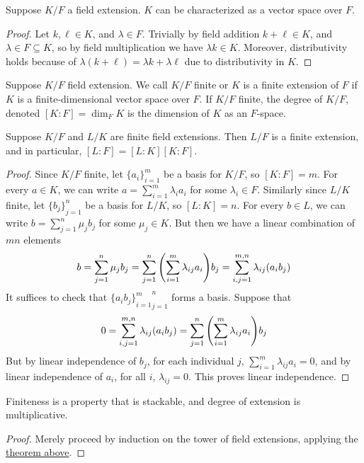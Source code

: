 \begin{proposition}\label{prop:field-extension-vsp}
    Suppose \(K/F\) a field extension.
    \(K\) can be characterized as a vector space over \(F\).
\end{proposition}
\begin{proof}
    Let \(k,\ell \in K\), and \(\lambda \in F\).
    Trivially by field addition \(k + \ell \in K\),
    and \(\lambda \in F \subseteq K\),
    so by field multiplication we have \(\lambda k \in K\).
    Moreover, distributivity holds because of
    \(\lambda(k+\ell) = \lambda k + \lambda \ell\)
    due to distributivity in \(K\).
\end{proof}

\begin{definition}
    Suppose \(K/F\) field extension.
    We call \(K/F\) finite or \(K\) is a finite extension of \(F\)
    if \(K\) is a finite-dimensional vector space over \(F\).
    If \(K/F\) finite, the degree of \(K/F\),
    denoted \([K:F] = \dim_F K\)
    is the dimension of \(K\) as an \(F\)-space.
\end{definition}
\begin{theorem}\label{thm:finite-extension-stack}
    Suppose \(K/F\) and \(L/K\) are finite field extensions.
    Then \(L/F\) is a finite extension,
    and in particular, \([L:F] = [L:K][K:F]\).
\end{theorem}
\begin{proof}
    Since \(K/F\) finite, let \({\{a_i\}}_{i=1}^m\) be a basis for \(K/F\),
    so \([K:F] = m\).
    For every \(a \in K\), we can write \(a = \sum_{i=1}^m \lambda_i a_i\)
    for some \(\lambda_i \in F\).
    Similarly since \(L/K\) finite,
    let \({\{b_j\}}_{j=1}^n\) be a basis for \(L/K\), so \([L:K] = n\).
    For every \(b \in L\), we can write \(b = \sum_{j=1}^n \mu_j b_j\)
    for some \(\mu_j \in K\).
    But then we have a linear combination of \(mn\) elements
    \begin{equation*}
        b = \sum_{j=1}^n \mu_j b_j
        = \sum_{j=1}^n \qty(\sum_{i=1}^m \lambda_{ij} a_i) b_j
        = \sum_{i,j=1}^{m,n} \lambda_{ij} (a_i b_j)
    \end{equation*}
    It suffices to check that \({{\{a_i b_j\}}_{i=1}^m}_{j=1}^n\) forms a basis.
    Suppose that
    \begin{equation*}
        0 = \sum_{i,j=1}^{m,n} \lambda_{ij} (a_i b_j)
        = \sum_{j=1}^n \qty(\sum_{i=1}^m \lambda_{ij} a_i) b_j
    \end{equation*}
    But by linear independence of \(b_j\),
    for each individual \(j\), \(\sum_{i=1}^m \lambda_{ij} a_i = 0\),
    and by linear independence of \(a_i\),
    for all \(i\), \(\lambda_{ij} = 0\).
    This proves linear independence.
\end{proof}
\begin{corollary}
    Finiteness is a property that is stackable,
    and degree of extension is multiplicative.
\end{corollary}
\begin{proof}
    Merely proceed by induction on the tower of field extensions,
    applying the \hyperref[thm:finite-extension-stack]{theorem above}.
\end{proof}

